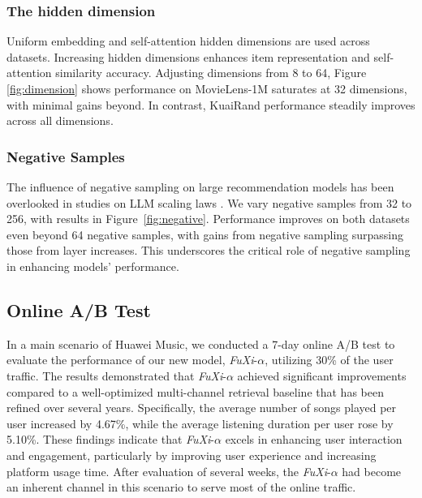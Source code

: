 \subsubsection{The hidden dimension}
Uniform embedding and self-attention hidden dimensions are used across datasets. Increasing hidden dimensions enhances item representation and self-attention similarity accuracy. Adjusting dimensions from 8 to 64, Figure \ref{fig:dimension} shows performance on MovieLens-1M saturates at 32 dimensions, with minimal gains beyond. In contrast, KuaiRand performance steadily improves across all dimensions.

\subsubsection{Negative Samples}
The influence of negative sampling on large recommendation models has been overlooked in studies on LLM scaling laws \cite{kaplan2020scaling,hoffmann2022training}. We vary negative samples from 32 to 256, with results in Figure~\ref{fig:negative}. Performance improves on both datasets even beyond 64 negative samples, with gains from negative sampling surpassing those from layer increases. This underscores the critical role of negative sampling in enhancing 
models' performance.

\subsection{Online A/B Test}

In a main scenario of Huawei Music, we conducted a 7-day online A/B test to evaluate the performance of our new model, \textit{FuXi}-$\alpha$, utilizing 30\% of the user traffic. The results demonstrated that \textit{FuXi}-$\alpha$ achieved significant improvements compared to a well-optimized multi-channel retrieval baseline that has been refined over several years. Specifically, the average number of songs played per user increased by 4.67\%, while the average listening duration per user rose by 5.10\%. These findings indicate that \textit{FuXi}-$\alpha$ excels in enhancing user interaction and engagement, particularly by improving user experience and increasing platform usage time.
After evaluation of several weeks, the \textit{FuXi}-$\alpha$ had become an inherent channel in this scenario to serve most of the online traffic.

